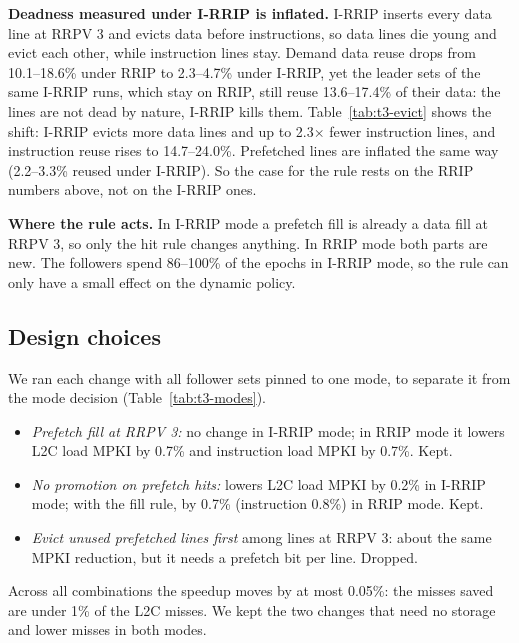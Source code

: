 \textbf{Deadness measured under I-RRIP is inflated.} I-RRIP inserts every data line at RRPV 3 and evicts data before instructions, so data lines die young and evict each other, while instruction lines stay. Demand data reuse drops from 10.1--18.6\% under RRIP to 2.3--4.7\% under I-RRIP, yet the leader sets of the same I-RRIP runs, which stay on RRIP, still reuse 13.6--17.4\% of their data: the lines are not dead by nature, I-RRIP kills them. Table~\ref{tab:t3-evict} shows the shift: I-RRIP evicts more data lines and up to 2.3$\times$ fewer instruction lines, and instruction reuse rises to 14.7--24.0\%. %
Prefetched lines are inflated the same way (2.2--3.3\% reused under I-RRIP). So the case for the rule rests on the RRIP numbers above, not on the I-RRIP ones.

\begin{table}[H]
\centering
\small

\caption{L2C evictions (thousands, all sets) by what filled the victim, follower sets pinned to RRIP or I-RRIP, SPP on, prefetch rule off.}\label{tab:t3-evict}
\end{table}

\textbf{Where the rule acts.} In I-RRIP mode a prefetch fill is already a data fill at RRPV 3, so only the hit rule changes anything. In RRIP mode both parts are new. The followers spend 86--100\% of the epochs in I-RRIP mode, so the rule can only have a small effect on the dynamic policy.

\subsection{Design choices}

We ran each change with all follower sets pinned to one mode, to separate it from the mode decision (Table~\ref{tab:t3-modes}).
\begin{itemize}
  \item \emph{Prefetch fill at RRPV 3:} no change in I-RRIP mode; in RRIP mode it lowers L2C load MPKI by 0.7\% and instruction load MPKI by 0.7\%. Kept.
  \item \emph{No promotion on prefetch hits:} lowers L2C load MPKI by 0.2\% in I-RRIP mode; with the fill rule, by 0.7\% (instruction 0.8\%) in RRIP mode. Kept.
  \item \emph{Evict unused prefetched lines first} among lines at RRPV 3: about the same MPKI reduction, but it needs a prefetch bit per line. Dropped.
\end{itemize}
Across all combinations the speedup moves by at most 0.05\%: the misses saved are under 1\% of the L2C misses. We kept the two changes that need no storage and lower misses in both modes.

